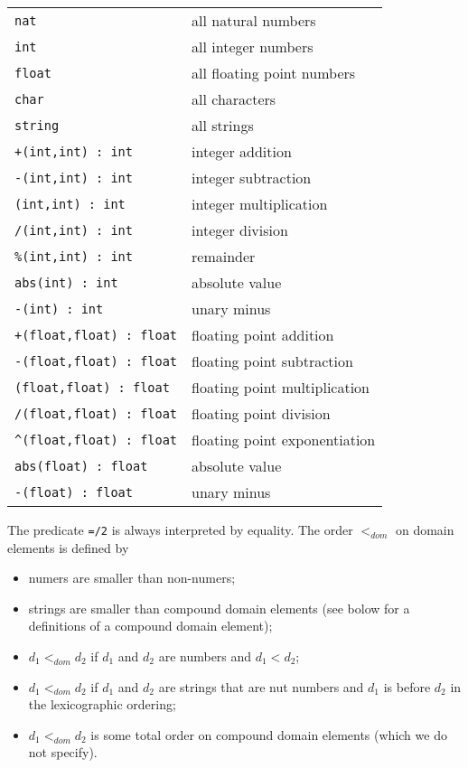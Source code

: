 \documentclass[a4]{article}
\newcommand{\code}[1]{{\tt #1}}
\begin{document}
\begin{center}
	
\begin{tabular}{l|l}
\code{nat} & all natural numbers \\
\code{int} & all integer numbers \\ 
\code{float} & all floating point numbers \\
\code{char} & all characters \\
\code{string} & all strings \\
\code{+(int,int) : int} & integer addition \\
\code{-(int,int) : int } &integer subtraction \\
\code{*(int,int) : int} & integer multiplication \\
\code{/(int,int) : int} & integer division \\
\code{\%(int,int) : int} & remainder \\
\code{abs(int) : int} & absolute value \\
\code{-(int) : int} & unary minus \\
\code{+(float,float) : float} & floating point addition \\
\code{-(float,float) : float} & floating point subtraction \\
\code{*(float,float) : float} & floating point multiplication \\
\code{/(float,float) : float} & floating point division \\ 
\code{\textasciicircum(float,float) : float} & floating point exponentiation \\
\code{abs(float) : float} & absolute value \\
\code{-(float) : float} & unary minus
\end{tabular} 

\end{center}

The predicate \code{=/2} is always interpreted by equality.  The order $<_{dom}$ on domain elements is defined by
\begin{itemize}
	\item numers are smaller than non-numers;
\item strings are smaller than compound domain elements (see bolow for a definitions of a compound domain element);
\item $d_1<_{dom} d_2$ if $d_1$ and $d_2$ are numbers and $d_1<d_2$;
\item $d_1<_{dom} d_2$ if $d_1$ and $d_2$ are strings that are nut numbers and $d_1$ is before $d_2$ in the lexicographic ordering;
\item $d_1<_{dom} d_2$ is some total order on compound domain elements (which we do not specify).
\end{itemize}
\end{document}
